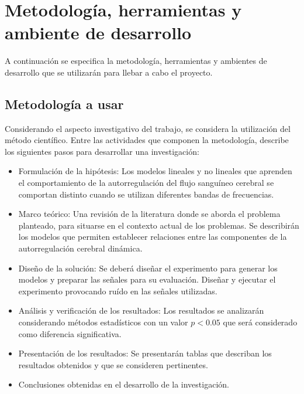 \section{Metodología, herramientas y ambiente de desarrollo}
A continuación se especifica la metodología, herramientas y ambientes de desarrollo que se utilizarán para llebar a cabo el proyecto.

\subsection{Metodología a usar}
Considerando el aspecto investigativo del trabajo, se considera la utilización del método científico. Entre las actividades que componen la metodología,  describe los siguientes pasos para desarrollar una investigación:

\begin{itemize}
    \item Formulación de la hipótesis: Los modelos lineales y no lineales que aprenden el comportamiento de la autorregulación del flujo sanguíneo cerebral se comportan distinto cuando se utilizan diferentes bandas de frecuencias.

    \item Marco teórico: Una revisión de la literatura donde se aborda el problema planteado, para situarse en el contexto actual de los problemas. Se describirán los modelos que permiten establecer relaciones entre las componentes de la autorregulación cerebral dinámica.

    \item Diseño de la solución: Se deberá diseñar el experimento para generar los modelos y preparar las señales para su evaluación. Diseñar y ejecutar el experimento provocando ruído en las señales utilizadas.

    \item Análisis y verificación de los resultados: Los resultados se analizarán considerando métodos estadísticos con un valor $p < 0.05$ que será considerado como diferencia significativa.

    \item Presentación de los resultados: Se presentarán tablas que describan los resultados obtenidos y que se consideren pertinentes.

    \item Conclusiones obtenidas en el desarrollo de la investigación.
\end{itemize}

